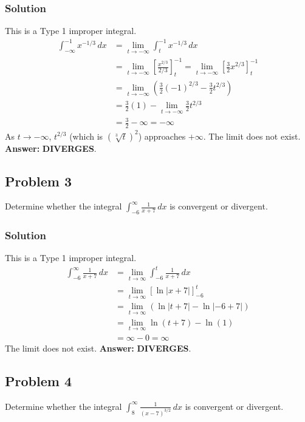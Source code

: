 \documentclass{article}
\begin{document}
\subsubsection*{Solution}
This is a Type 1 improper integral.
\begin{align*}
    \int_{-\infty}^{-1} x^{-1/3} \,dx &= \lim_{t \to -\infty} \int_{t}^{-1} x^{-1/3} \,dx \\
    &= \lim_{t \to -\infty} \left[ \frac{x^{2/3}}{2/3} \right]_{t}^{-1} = \lim_{t \to -\infty} \left[ \frac{3}{2}x^{2/3} \right]_{t}^{-1} \\
    &= \lim_{t \to -\infty} \left( \frac{3}{2}(-1)^{2/3} - \frac{3}{2}t^{2/3} \right) \\
    &= \frac{3}{2}(1) - \lim_{t \to -\infty} \frac{3}{2}t^{2/3} \\
    &= \frac{3}{2} - \infty = -\infty
\end{align*}
As $t \to -\infty$, $t^{2/3}$ (which is $(\sqrt[3]{t})^2$) approaches $+\infty$. The limit does not exist.
\textbf{Answer:} \textbf{DIVERGES}.

\subsection{Problem 3}
Determine whether the integral $ \int_{-6}^{\infty} \frac{1}{x+7} \,dx $ is convergent or divergent.
\subsubsection*{Solution}
This is a Type 1 improper integral.
\begin{align*}
    \int_{-6}^{\infty} \frac{1}{x+7} \,dx &= \lim_{t \to \infty} \int_{-6}^{t} \frac{1}{x+7} \,dx \\
    &= \lim_{t \to \infty} \left[ \ln|x+7| \right]_{-6}^{t} \\
    &= \lim_{t \to \infty} \left( \ln|t+7| - \ln|-6+7| \right) \\
    &= \lim_{t \to \infty} \ln(t+7) - \ln(1) \\
    &= \infty - 0 = \infty
\end{align*}
The limit does not exist.
\textbf{Answer:} \textbf{DIVERGES}.

\subsection{Problem 4}
Determine whether the integral $ \int_{8}^{\infty} \frac{1}{(x-7)^{3/2}} \,dx $ is convergent or divergent.
\end{document}
